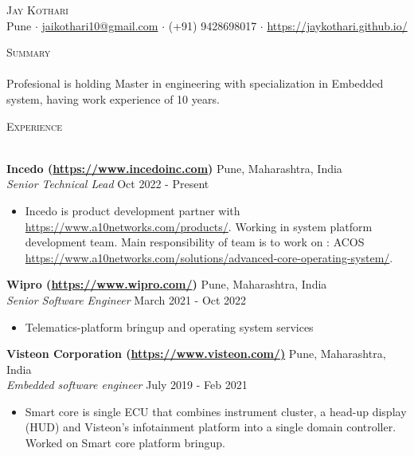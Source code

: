 \documentclass[a4paper]{article}
\newcommand{\lineunder} {
    \vspace*{-8pt} \\
    \hspace*{-18pt} \hrulefill \\
}
\newcommand{\header} [1] {
    {\hspace*{-18pt}\vspace*{6pt} \textsc{#1}}
    \vspace*{-6pt} \lineunder
}
\begin{document}
\vspace*{-40pt}

    

\vspace*{-10pt}
\begin{center}
	{\Huge \scshape {Jay Kothari}}\\
	Pune $\cdot$ \url{jaikothari10@gmail.com} $\cdot$ (+91) 9428698017 $\cdot$ \url{https://jaykothari.github.io/}\\
\end{center}

\header{Summary}
\vspace{1mm}
Profesional is holding Master in engineering with specialization in Embedded system, having work experience of 10 years.
\vspace{2mm}

\header{Experience}
\vspace{1mm}

\textbf{Incedo (\url{https://www.incedoinc.com})} \hfill Pune, Maharashtra, India\\
\textit{Senior Technical Lead} \hfill Oct 2022 - Present\\
\vspace{-1mm}
\begin{itemize} \itemsep 1pt
	\item Incedo is product development partner with \url{https://www.a10networks.com/products/}. Working in system platform development team. Main responsibility of team is to work on : 
	ACOS \url{https://www.a10networks.com/solutions/advanced-core-operating-system/}.
\end{itemize}

\textbf{Wipro (\url{https://www.wipro.com/})} \hfill Pune, Maharashtra, India\\
\textit{Senior Software Engineer} \hfill March 2021 - Oct 2022\\
\vspace{-1mm}
\begin{itemize} \itemsep 1pt
	\item Telematics-platform bringup and operating system services
\end{itemize}

\textbf{Visteon Corporation (\url{https://www.visteon.com/)}} \hfill Pune, Maharashtra, India\\
\textit{Embedded software engineer} \hfill July 2019 - Feb 2021\\
\vspace{-1mm}
\begin{itemize} \itemsep 1pt
	\item Smart core is single ECU that combines instrument cluster, a head-up display (HUD) and Visteon’s infotainment platform into a single domain controller. Worked on Smart core platform bringup. 
\end{itemize}
\end{document}
